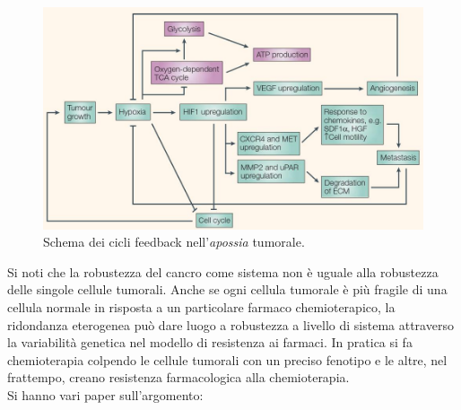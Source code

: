 \documentclass[a4paper,12pt, oneside]{book}
\begin{document}
\begin{figure}
  \centering
  \includegraphics[scale = 0.35]{img/apo.jpg}
  \caption{Schema dei cicli feedback nell'\textit{apossia} tumorale.} 
  \label{fig:apo}
\end{figure}
Si noti che la robustezza del cancro come sistema non è uguale alla robustezza
delle singole cellule tumorali. Anche se ogni cellula tumorale è più fragile di
una cellula normale in risposta a un particolare farmaco chemioterapico,
la ridondanza eterogenea può dare luogo a robustezza a livello di sistema
attraverso la variabilità genetica nel modello di resistenza ai farmaci. In
pratica si fa chemioterapia colpendo le cellule tumorali con un preciso fenotipo
e le altre, nel frattempo, creano resistenza farmacologica alla chemioterapia.\\
Si hanno vari paper sull'argomento:
\end{document}
